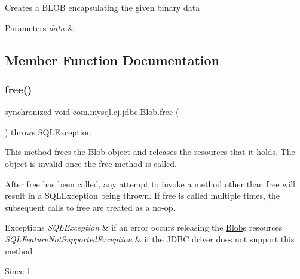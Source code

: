Creates a B\+L\+OB encapsulating the given binary data


\begin{DoxyParams}{Parameters}
{\em data} & \\
\hline
\end{DoxyParams}


\subsection{Member Function Documentation}
\mbox{\label{classcom_1_1mysql_1_1cj_1_1jdbc_1_1_blob_a60c2e9853dd25824771ebfd142d89f2d}} 
\subsubsection{\texorpdfstring{free()}{free()}}
{\footnotesize\ttfamily synchronized void com.\+mysql.\+cj.\+jdbc.\+Blob.\+free (\begin{DoxyParamCaption}{ }\end{DoxyParamCaption}) throws S\+Q\+L\+Exception}

This method frees the {\ttfamily \mbox{\hyperlink{classcom_1_1mysql_1_1cj_1_1jdbc_1_1_blob}{Blob}}} object and releases the resources that it holds. The object is invalid once the {\ttfamily free} method is called. 

After {\ttfamily free} has been called, any attempt to invoke a method other than {\ttfamily free} will result in a {\ttfamily S\+Q\+L\+Exception} being thrown. If {\ttfamily free} is called multiple times, the subsequent calls to {\ttfamily free} are treated as a no-\/op. 


\begin{DoxyExceptions}{Exceptions}
{\em S\+Q\+L\+Exception} & if an error occurs releasing the \mbox{\hyperlink{classcom_1_1mysql_1_1cj_1_1jdbc_1_1_blob}{Blob}}\textquotesingle{}s resources \\
\hline
{\em S\+Q\+L\+Feature\+Not\+Supported\+Exception} & if the J\+D\+BC driver does not support this method \\
\hline
\end{DoxyExceptions}
\begin{DoxySince}{Since}
1. 
\end{DoxySince}
\mbox{\label{classcom_1_1mysql_1_1cj_1_1jdbc_1_1_blob_a1a540e23ff3d83e99a0eb47352f685e1}} 
